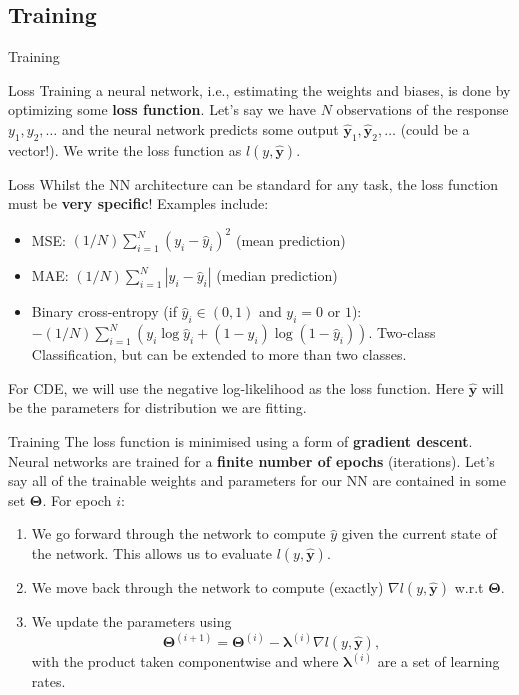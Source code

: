 \documentclass{beamer}
\begin{document}
\subsection{Training}
\begin{frame}
\begin{center}
\Huge Training
\end{center}
\end{frame}
\begin{frame}{Loss}
Training a neural network, i.e., estimating the weights and biases, is done by optimizing some \textbf{loss function}. Let's say we have $N$ observations of the response $y_1,y_2,\dots$ and the neural network predicts some output $\hat{\mathbf{y}}_1,\hat{\mathbf{y}}_2,\dots$ (could be a vector!). We write the loss function as $l({y},\hat{\mathbf{y}}).$
\end{frame}
\begin{frame}{Loss}
 Whilst the NN architecture can be standard for any task, the loss function must be \textbf{very specific}! Examples include:
\begin{itemize}
\item MSE: $(1/N)\sum^N_{i=1}(y_i-\hat{y}_i)^2$ (mean prediction)
\item MAE: $(1/N)\sum^N_{i=1}|y_i-\hat{y}_i|$ (median prediction)
\item Binary cross-entropy (if $\hat{y}_i\in(0,1)$ and $y_i=0$ or $1$): $-(1/N)\sum^N_{i=1}(y_i\log\hat{y}_i+(1-y_i)\log(1-\hat{y}_i))$. Two-class Classification, but can be extended to more than two classes.
\end{itemize}
For CDE, we will use the negative log-likelihood as the loss function. Here $\hat{\mathbf{y}}$ will be the parameters for distribution we are fitting.
\end{frame}
\begin{frame}{Training}
The loss function is minimised using a form of \textbf{gradient descent}. Neural networks are trained for a \textbf{finite number of epochs} (iterations). Let's say all of the trainable weights and parameters for our NN are contained in some set $\boldsymbol{\Theta}$.   For epoch $i$:
\begin{enumerate}
\item We go forward through the network to compute $\hat{{y}}$ given the current state of the network. This allows us to evaluate $l({y},\hat{\mathbf{y}})$.
\item We move back through the network to compute (exactly) $\nabla l({y},\hat{\mathbf{y}})$ w.r.t $\boldsymbol{\Theta}$.
\item We update the parameters using
\[
\boldsymbol{\Theta}^{(i+1)}=\boldsymbol{\Theta}^{(i)}-\boldsymbol{\lambda}^{(i)}\nabla l({y},\hat{\mathbf{y}}),
\] 
with the product taken componentwise and where $\boldsymbol{\lambda}^{(i)}$ are a set of learning rates.
\end{enumerate} 
\end{frame}
\end{document}
